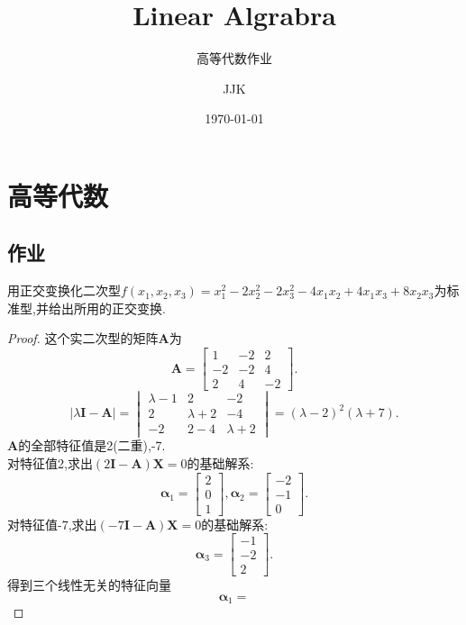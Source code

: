 \documentclass[lang=cn,11pt,normal]{elegantbook}
\title{Linear Algrabra}
\subtitle{高等代数作业}
\author{JJK}
\institute{Jiang Xi science and technology University}
\date{\today}
\begin{document}
	\maketitle
	\mainmatter
	\hypersetup{pageanchor=true}
	\chapter{高等代数}
	\section{作业}
	\begin{exercise}
		用正交变换化二次型$f(x_1,x_2,x_3)=x_1^2-2x_2^2-2x_3^2-4x_1x_2+4x_1x_3+8x_2x_3$为标准型,并给出所用的正交变换.
	\end{exercise}
	\begin{proof}
		这个实二次型的矩阵$\boldsymbol{A}$为\\
		$$
		\boldsymbol{A}=
		\begin{bmatrix}
		1&-2&2\\
		-2&-2&4\\
		2&4&-2
		\end{bmatrix}.
		$$
		$$
		|\lambda\boldsymbol{I}-\boldsymbol{A}|=
		\begin{vmatrix}
		\lambda-1&2&-2\\
		2&\lambda+2&-4\\
		-2&2-4&\lambda+2
		\end{vmatrix}
		=(\lambda-2)^2(\lambda+7).
		$$
		$\boldsymbol{A}$的全部特征值是2(二重),-7.\\
		对特征值2,求出$(2\boldsymbol{I}-\boldsymbol{A})\boldsymbol{X}=0$的基础解系:
		$$
		\boldsymbol{\alpha}_1=
		\begin{bmatrix}
		2\\0\\1
		\end{bmatrix},
		\boldsymbol{\alpha}_2=
		\begin{bmatrix}
		-2\\-1\\0
		\end{bmatrix}.
		$$
		对特征值-7,求出$(-7\boldsymbol{I}-\boldsymbol{A})\boldsymbol{X}=0$的基础解系:\\
		$$
		\boldsymbol{\alpha}_3=
		\begin{bmatrix}
		-1\\-2\\2
		\end{bmatrix}.
		$$
		得到三个线性无关的特征向量
		$$
		\boldsymbol{\alpha}_1=
$$
\end{proof}
\end{document}
